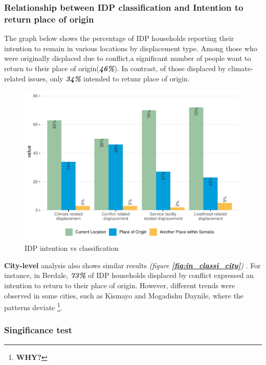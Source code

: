 \documentclass[
]{article}
\begin{document}
\subsubsection{Relationship between IDP classification and Intention to
return place of
origin}\label{relationship-between-idp-classification-and-intention-to-return-place-of-origin}

The graph below shows the percentage of IDP households reporting their
intention to remain in various locations by displacement type. Among
those who were originally displaced due to conflict,a significant number
of people want to return to their place of origin(\textbf{\emph{46\%}}).
In contrast, of those displaced by climate-related issues, only
\textbf{\emph{34\%}} intended to retunr place of origin.

\begin{figure}[H]

{\centering \includegraphics[width=0.8\linewidth,height=0.8\textheight]{climate_vs_conflict_files/figure-latex/idp_int_class-1} 

}

\caption{IDP intention vs classification}\label{fig:idp_int_class}
\end{figure}

\textbf{City-level} analysis also shows similar results \emph{(figure
\textbf{\textcolor{blue}{\ref{fig:in_classi_city}}})} . For instance, in
Berdale, \textbf{\emph{73\%}} of IDP households displaced by conflict
expressed an intention to return to their place of origin. However,
different trends were observed in some cities, such as Kismayo and
Mogadishu Daynile, where the patterns deviate \footnote{\textbf{WHY?}}.

\subsubsection{Singificance test}\label{singificance-test}
\end{document}
